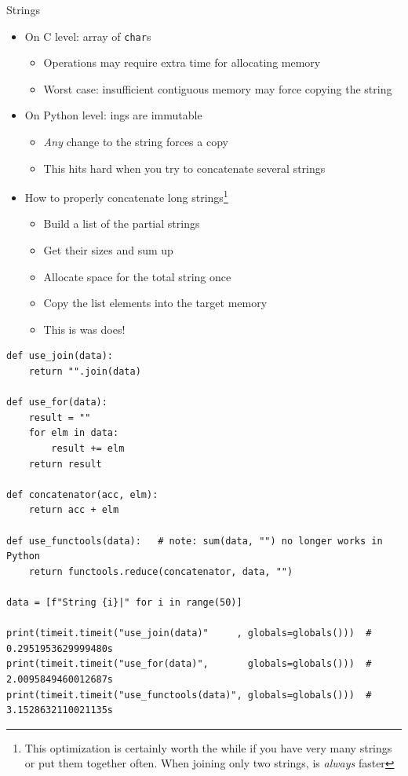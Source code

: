 \begin{frame}{Strings}
%
\begin{itemize}
\item On C level: array of \texttt{char}s
	\begin{itemize}
	\item Operations may require extra time for allocating memory
	\item Worst case: insufficient contiguous memory may force copying the string
	\end{itemize}
\item On Python level: ings are immutable
	\begin{itemize}
	\item \emph{Any} change to the string forces a copy
	\item This hits hard when you try to concatenate several strings
	\end{itemize}
\item How to properly concatenate long strings\footnote{%
This optimization is certainly worth the while if you have very many strings or put them together often. When joining only two strings,  is \emph{always} faster
}
	\begin{itemize}
	\item Build a list of the partial strings
	\item Get their sizes and sum up
	\item Allocate space for the total string once
	\item Copy the list elements into the target memory
	\item[\Thus] This is was  does!
	\end{itemize}
\end{itemize}
%
\end{frame}


\begin{frame}[fragile]
%
\begin{codebox}
\begin{verbatim}
def use_join(data):
    return "".join(data)

def use_for(data):
    result = ""
    for elm in data:
        result += elm
    return result

def concatenator(acc, elm):
    return acc + elm

def use_functools(data):   # note: sum(data, "") no longer works in Python
    return functools.reduce(concatenator, data, "")

data = [f"String {i}|" for i in range(50)]

print(timeit.timeit("use_join(data)"     , globals=globals()))  # 0.2951953629999480s
print(timeit.timeit("use_for(data)",       globals=globals()))  # 2.0095849460012687s
print(timeit.timeit("use_functools(data)", globals=globals()))  # 3.1528632110021135s
\end{verbatim}
\end{codebox}
%
\end{frame}

